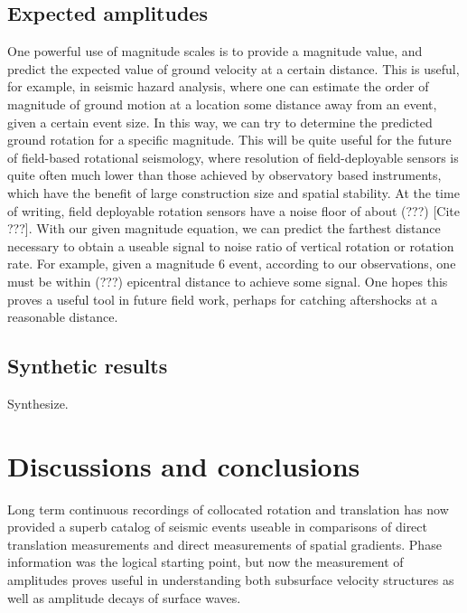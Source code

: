 \documentclass{gji}
\begin{document}
\subsection{Expected amplitudes}
One powerful use of magnitude scales is to provide a magnitude value, and predict the expected value of ground velocity at a certain distance. This is useful, for example, in seismic hazard analysis, where one can estimate the order of magnitude of ground motion at a location some distance away from an event, given a certain event size. In this way, we can try to determine the predicted ground rotation for a specific magnitude. This will be quite useful for the future of field-based rotational seismology, where resolution of field-deployable sensors is quite often much lower than those achieved by observatory based instruments, which have the benefit of large construction size and spatial stability. At the time of writing, field deployable rotation sensors have a noise floor of about (???) [Cite ???]. With our given magnitude equation, we can predict the farthest distance necessary to obtain a useable signal to noise ratio of vertical rotation or rotation rate. For example, given a magnitude 6 event, according to our observations, one must be within (???) epicentral distance to achieve some signal. One hopes this proves a useful tool in future field work, perhaps for catching aftershocks at a reasonable distance.

\subsection{Synthetic results}
Synthesize.

\section{Discussions and conclusions}
Long term continuous recordings of collocated rotation and translation has now provided a superb catalog of seismic events useable in comparisons of direct translation measurements and direct measurements of spatial gradients. Phase information was the logical starting point, but now the measurement of amplitudes proves useful in understanding both subsurface velocity structures as well as amplitude decays of surface waves. 
\end{document}
